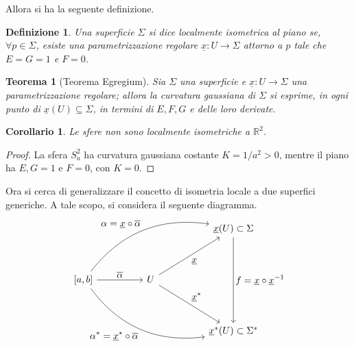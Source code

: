 \documentclass[12pt]{scrartcl}
\theoremstyle{style}
\newtheorem{definizione}{Definizione}[section]
\newtheorem{teorema}{Teorema}[section]
\newtheorem{corollario}{Corollario}[teorema]
\numberwithin{equation}{subsection}
\begin{document}
Allora si ha la seguente definizione.
\begin{definizione}
	Una superficie $\Sigma$ si dice \textit{localmente isometrica} al piano se, $\forall p \in \Sigma$, esiste una parametrizzazione regolare $\underline{x}: U \to \Sigma$ attorno a $p$ tale che $E = G = 1 $ e $F=0$.
\end{definizione}
\begin{teorema}
	[Teorema Egregium]
	Sia $\Sigma$ una superficie e $\underline{x}: U \to \Sigma$ una parametrizzazione regolare; allora la curvatura gaussiana di $\Sigma$ si esprime, in ogni punto di $\underline{x}(U) \subseteq \Sigma$, in termini di $E,F,G$ e delle loro derivate.
\end{teorema}
\begin{corollario}
	Le sfere non sono localmente isometriche a $\mathbb{R}^2$.
\end{corollario}
	\begin{proof}
		La sfera $S^2_a$ ha curvatura gaussiana costante $K = 1 / a^2  > 0$, mentre il piano ha $E,G = 1$ e $F = 0$, con $K = 0$.
	\end{proof}
\noindent Ora si cerca di generalizzare il concetto di isometria locale a due superfici generiche.
A tale scopo, si considera il seguente diagramma.
\[
\begin{tikzcd}
	& & & &  \underline{x}(U) \subset \Sigma\\
	\\
	\left[ a,b \right]  & & U \\
	\\
	& & & &  \underline{x}^*(U) \subset \Sigma^*
	\arrow[from=3-1, to=3-3, "\displaystyle \overline{\alpha}"]
	\arrow[from=3-3, to=1-5, "\displaystyle \underline{x}"']
	\arrow[from=3-3, to=5-5, "\displaystyle \underline{x}^*"]
	\arrow[from=3-1, to=1-5, bend left,"\displaystyle \alpha = \underline{x}\circ \overline{\alpha }"] 
	\arrow[from=3-1, to=5-5, bend right, "\displaystyle \alpha^* = \underline{x}^*\circ \overline{\alpha }"'] 
	\arrow[from=1-5, to=5-5, "\displaystyle f=\underline{x}\circ \underline{x}^{-1}"]
\end{tikzcd}
\] 
\end{document}
